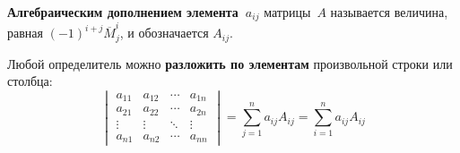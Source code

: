  \textbf{Алгебраическим дополнением элемента~$a_{ij}$} матрицы~$A$ называется величина, равная $(-1)^{i+j} \overline M_j^i$, и обозначается $A_{ij}$.

\begin{theorem}
\label{th:determinant_expansion}
Любой определитель можно \textbf{разложить по элементам} произвольной строки или столбца:
\begin{equation*}
\begin{vmatrix}
a_{11} & a_{12} & \cdots & a_{1n} \\
a_{21} & a_{22} & \cdots & a_{2n} \\
\vdots & \vdots & \ddots & \vdots \\
a_{n1} & a_{n2} & \cdots & a_{nn}
\end{vmatrix} =
\sum_{j=1}^n a_{ij} A_{ij} =
\sum_{i=1}^n a_{ij} A_{ij}
\end{equation*}
\end{theorem}
